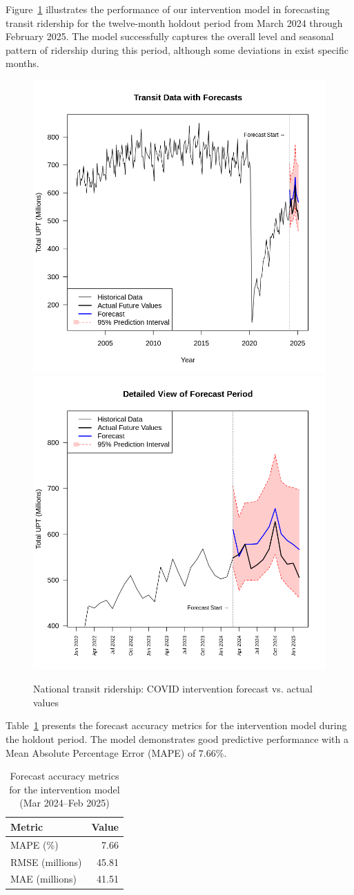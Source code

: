 \documentclass[11pt]{article}
\begin{document}
Figure~\ref{f:intervention_forecast} illustrates the performance of our intervention model in forecasting transit ridership for the twelve-month holdout period from March 2024 through February 2025. The model successfully captures the overall level and seasonal pattern of ridership during this period, although some deviations in exist specific months.

\begin{figure}[!ht]
\centering
\includegraphics[width=0.485\linewidth]{forecast_post.png}
\includegraphics[width=0.485\linewidth]{forecast_post_close.png}
\caption{National transit ridership: COVID intervention forecast vs. actual values}
\label{f:intervention_forecast}
\end{figure}

Table~\ref{tab:forecast_accuracy} presents the forecast accuracy metrics for the intervention model during the holdout period. The model demonstrates good predictive performance with a Mean Absolute Percentage Error (MAPE) of $7.66\%$.

\begin{table}[!ht]
\centering
\caption{Forecast accuracy metrics for the intervention model (Mar 2024--Feb 2025)}
\label{tab:forecast_accuracy}
\begin{tabular}{lr}
\hline
Metric & Value \\
\hline
MAPE (\%) & 7.66 \\
RMSE (millions) & 45.81 \\
MAE (millions) & 41.51 \\
\hline
\end{tabular}
\end{table}
\end{document}
